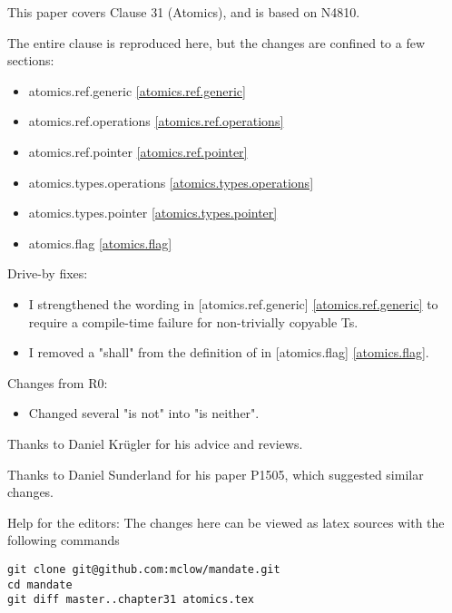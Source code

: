 This paper covers Clause 31 (Atomics), and is based on N4810.

The entire clause is reproduced here, but the changes are confined to a few sections:

\begin{itemize}
\item{atomics.ref.generic}		\ref{atomics.ref.generic}
\item{atomics.ref.operations}	\ref{atomics.ref.operations}
\item{atomics.ref.pointer}		\ref{atomics.ref.pointer}
\item{atomics.types.operations}	\ref{atomics.types.operations}
\item{atomics.types.pointer}	\ref{atomics.types.pointer}
\item{atomics.flag}				\ref{atomics.flag}
\end{itemize}

Drive-by fixes:
\begin{itemize}
\item{I strengthened the wording in [atomics.ref.generic] \ref{atomics.ref.generic} to require a compile-time failure for non-trivially copyable Ts.}
\item{I removed a "shall" from the definition of  in [atomics.flag] \ref{atomics.flag}.}
\end{itemize}



Changes from R0:
\begin{itemize}
\item{Changed several "is not" into "is neither".}
\end{itemize}

Thanks to Daniel Krügler for his advice and reviews.

Thanks to Daniel Sunderland for his paper P1505, which suggested similar changes.

\vfill
Help for the editors: The changes here can be viewed as latex sources with the following commands
\begin{verbatim}
git clone git@github.com:mclow/mandate.git
cd mandate
git diff master..chapter31 atomics.tex
\end{verbatim}
